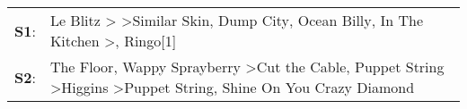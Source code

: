 \begin{supertabular}{p{0.03\textwidth}p{0.92\textwidth}}
 \textbf{S1}:  &  Le Blitz\textsuperscript{} \textgreater {}\textsuperscript{} \textgreater \enspace Similar Skin\textsuperscript{}, \enspace Dump City\textsuperscript{}, \enspace Ocean Billy\textsuperscript{}, \enspace In The Kitchen\textsuperscript{} \textgreater {}\textsuperscript{}, \enspace Ringo[1]\textsuperscript{}  \enspace  \\
 \textbf{S2}:  &    The Floor\textsuperscript{}, \enspace Wappy Sprayberry\textsuperscript{} \textgreater \enspace Cut the Cable\textsuperscript{}, \enspace Puppet String\textsuperscript{} \textgreater \enspace Higgins\textsuperscript{} \textgreater \enspace Puppet String\textsuperscript{}, \enspace Shine On You Crazy Diamond\textsuperscript{}  \enspace  \\
\end{supertabular}
